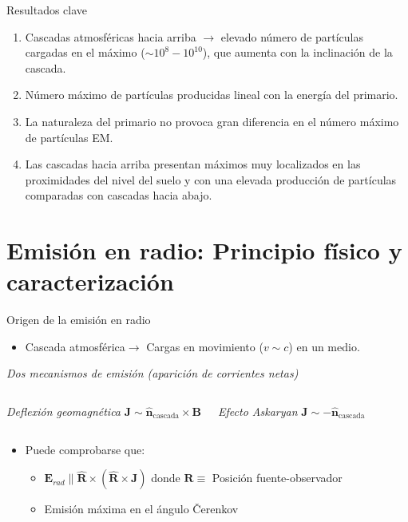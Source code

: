 \documentclass{beamer}
\newcommand{\vect}[1]{\boldsymbol{\mathbf{#1}}}
\begin{document}
\begin{frame}{Resultados clave}
	\begin{enumerate}
		\item Cascadas atmosféricas hacia arriba $\rightarrow$ elevado número de partículas cargadas en el máximo ($\sim 10^8-10^{10}$), que aumenta con la inclinación de la cascada. 
	\item Número máximo de partículas producidas lineal con la energía del primario. 
	\item La naturaleza del primario no provoca gran diferencia en el número máximo de partículas EM.
	\item Las cascadas hacia arriba presentan máximos muy localizados en las proximidades del nivel del suelo y con una elevada producción de partículas comparadas con cascadas hacia abajo.
	\end{enumerate}
\end{frame}
	\section{Emisión en radio: Principio físico y caracterización}
	\begin{frame}{Origen de la emisión en radio}
	\begin{itemize}
		\item Cascada atmosférica$\rightarrow$ Cargas en movimiento ($v\sim c$) en un medio.
	\end{itemize}
	\begin{block}{}
		\centering\textit{Dos mecanismos de emisión (aparición de corrientes netas)}
	\end{block}
	\begin{columns}
		\begin{block}{\centering\textit{Deflexión geomagnética}}
			\centering
			$\vect{J}\sim \hat{\vect{n}}_{\text{cascada}}\times\vect{B}$
		\end{block}
		\begin{block}{\centering\textit{Efecto Askaryan}}
			\centering
			$\vect{J}\sim-\hat{\vect{n}}_{\text{cascada}}$
		\end{block}
	\end{columns}
	\vspace{10mm}
	\begin{itemize}
		\item Puede comprobarse que:
		\begin{itemize} \item $\vect{E}_{rad}\parallel\hat{\vect{R}}\times\left(\hat{\vect{R}}\times\vect{J}\right)$ donde $\vect{R}\equiv$ Posición fuente-observador
			\item Emisión máxima en el ángulo \v{C}erenkov
		\end{itemize}
	\end{itemize}
\end{frame}
\end{document}
